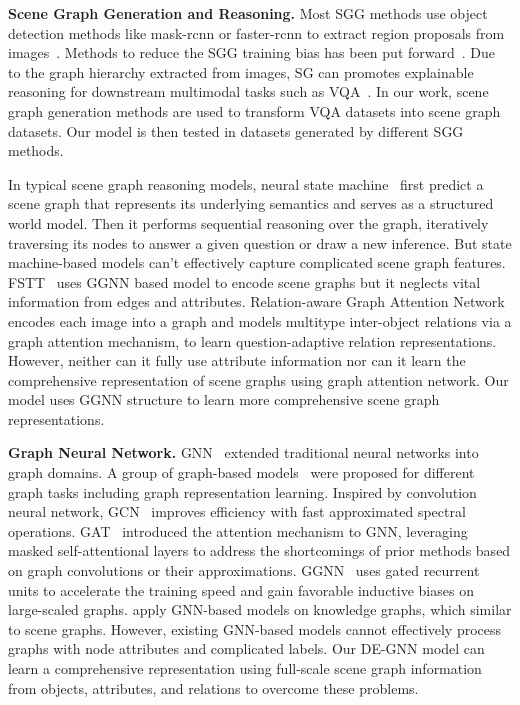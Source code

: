 \documentclass[letterpaper]{article} %
\begin{document}
\vspace{0.05in}
\noindent\textbf{Scene Graph Generation and Reasoning.}
Most SGG methods use object detection methods like mask-rcnn or faster-rcnn to extract region proposals from images~\cite{DBLP:conf/cvpr/XuZCF17,DBLP:conf/eccv/YangLLBP18,DBLP:conf/cvpr/ZellersYTC18,DBLP:conf/nips/WooKCK18,DBLP:conf/cvpr/DaiZL17,DBLP:conf/iccv/LiOZWW17,DBLP:conf/eccv/YinSLYWSL18}. Methods to reduce the SGG training bias has been put forward~\cite{DBLP:conf/cvpr/TangNHSZ20}. Due to the graph hierarchy extracted from images, SG can promotes explainable reasoning for downstream multimodal tasks such as VQA~\cite{DBLP:conf/bmvc/ZhangCX19}. In our work, scene graph generation methods are used to transform VQA datasets into scene graph datasets. Our model is then tested in datasets generated by different SGG methods.

In typical scene graph reasoning models, neural state machine~\cite{DBLP:conf/nips/HudsonM19} first predict a scene graph that represents its underlying semantics and serves as a structured world model. Then it performs sequential reasoning over the graph, iteratively traversing its nodes to answer a given question or draw a new inference. But state machine-based models can't effectively capture complicated scene graph features. FSTT~\cite{inproceedings} uses GGNN based model to encode scene graphs but it neglects vital information from edges and attributes. Relation-aware Graph Attention Network~\cite{DBLP:conf/iccv/LiGCL19} encodes each image into a graph and models multitype inter-object relations via a graph attention mechanism, to learn question-adaptive relation representations. However, neither can it fully use attribute information nor can it learn the comprehensive representation of scene graphs using graph attention network. Our model uses GGNN structure to learn more comprehensive scene graph representations. 

\vspace{0.05in}
\noindent\textbf{Graph Neural Network.}
GNN~\cite{DBLP:journals/tnn/ScarselliGTHM09} extended traditional neural networks into graph domains. A group of graph-based models~\cite{DBLP:conf/aaai/0001RFHLRG19,DBLP:conf/aaai/LiuCLZLSQ19} were proposed for different graph tasks including graph representation learning. Inspired by convolution neural network, GCN~\cite{DBLP:conf/iclr/KipfW17} improves efficiency with fast approximated spectral operations. GAT~\cite{DBLP:conf/iclr/VelickovicCCRLB18} introduced the attention mechanism to GNN, leveraging masked self-attentional layers to address the shortcomings of prior methods based on graph convolutions or their approximations. GGNN~\cite{DBLP:journals/corr/LiTBZ15} uses gated recurrent units to accelerate the training speed and gain favorable inductive biases on large-scaled graphs.
\cite{DBLP:conf/cncl/WangGCL16,DBLP:conf/aaai/WangCGL18,DBLP:conf/aistats/SunL19} apply GNN-based models on knowledge graphs, which similar to scene graphs.
However, existing GNN-based models cannot effectively process graphs with node attributes and complicated labels. Our DE-GNN model can learn a comprehensive representation using full-scale scene graph information from objects, attributes, and relations to overcome these problems.
\end{document}
